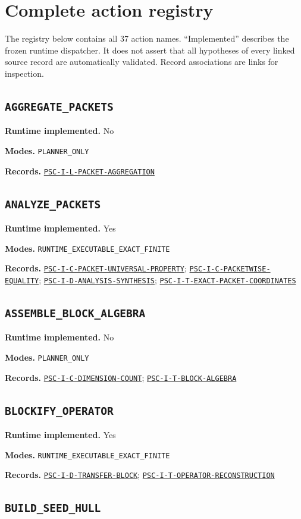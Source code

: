 \documentclass[a4paper,11pt]{article}
\newcommand{\field}[2]{\noindent\textbf{#1.} #2\par}
\begin{document}
\clearpage\section{Complete action registry}
The registry below contains all 37 action names. ``Implemented'' describes the frozen runtime dispatcher. It does not assert that all hypotheses of every linked source record are automatically validated. Record associations are links for inspection.
\subsection*{\nolinkurl{AGGREGATE_PACKETS}}
\field{Runtime implemented}{No}
\field{Modes}{\nolinkurl{PLANNER_ONLY}}
\field{Records}{\hyperref[rec:PSC-I-L-PACKET-AGGREGATION]{\nolinkurl{PSC-I-L-PACKET-AGGREGATION}}}
\subsection*{\nolinkurl{ANALYZE_PACKETS}}
\field{Runtime implemented}{Yes}
\field{Modes}{\nolinkurl{RUNTIME_EXECUTABLE_EXACT_FINITE}}
\field{Records}{\hyperref[rec:PSC-I-C-PACKET-UNIVERSAL-PROPERTY]{\nolinkurl{PSC-I-C-PACKET-UNIVERSAL-PROPERTY}}; \hyperref[rec:PSC-I-C-PACKETWISE-EQUALITY]{\nolinkurl{PSC-I-C-PACKETWISE-EQUALITY}}; \hyperref[rec:PSC-I-D-ANALYSIS-SYNTHESIS]{\nolinkurl{PSC-I-D-ANALYSIS-SYNTHESIS}}; \hyperref[rec:PSC-I-T-EXACT-PACKET-COORDINATES]{\nolinkurl{PSC-I-T-EXACT-PACKET-COORDINATES}}}
\subsection*{\nolinkurl{ASSEMBLE_BLOCK_ALGEBRA}}
\field{Runtime implemented}{No}
\field{Modes}{\nolinkurl{PLANNER_ONLY}}
\field{Records}{\hyperref[rec:PSC-I-C-DIMENSION-COUNT]{\nolinkurl{PSC-I-C-DIMENSION-COUNT}}; \hyperref[rec:PSC-I-T-BLOCK-ALGEBRA]{\nolinkurl{PSC-I-T-BLOCK-ALGEBRA}}}
\subsection*{\nolinkurl{BLOCKIFY_OPERATOR}}
\field{Runtime implemented}{Yes}
\field{Modes}{\nolinkurl{RUNTIME_EXECUTABLE_EXACT_FINITE}}
\field{Records}{\hyperref[rec:PSC-I-D-TRANSFER-BLOCK]{\nolinkurl{PSC-I-D-TRANSFER-BLOCK}}; \hyperref[rec:PSC-I-T-OPERATOR-RECONSTRUCTION]{\nolinkurl{PSC-I-T-OPERATOR-RECONSTRUCTION}}}
\subsection*{\nolinkurl{BUILD_SEED_HULL}}
\end{document}
